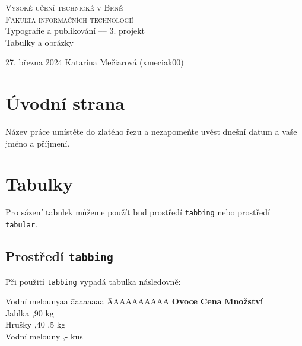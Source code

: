 \documentclass[11pt]{article}
\begin{document}
    \begin{titlepage}
        \begin{center}
            \Huge\textsc{Vysoké učení technické v Brně}\\
            \huge\textsc{Fakulta informačních technologií}\\
            {Typografie a publikování –– 3. projekt}\\
            \Huge{Tabulky a obrázky}\\
        \end{center}
        {\LARGE 27. března 2024 \hfill
        Katarína Mečiarová (xmeciak00)}

    \end{titlepage}

    \section{Úvodní strana}
    Název práce umístěte do zlatého řezu a nezapomeňte uvést dnešní datum a vaše jméno a příjmení.

    \section{Tabulky}
    Pro sázení tabulek můžeme použít bud prostředí \verb|tabbing| nebo prostředí \verb|tabular|.

    \subsection{Prostředí \texttt{tabbing}}
    Při použití \verb|tabbing| vypadá tabulka následovně:
    \begin{tabbing}
        Vodní melounyaa             \=aaaaaaaa              \=AAAAAAAAAA        \kill
        \textbf{Ovoce}      \> \textbf{Cena}        \> \textbf{Množství}        \\
        Jablka              ,90                 kg                     \\
        Hrušky              ,40                ,5 kg                   \\
        Vodní melouny       ,-                  kus                    \\
    \end{tabbing}
\end{document}
